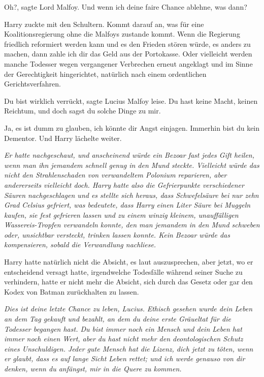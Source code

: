\glqq{}Oh?\grqq{}, sagte Lord Malfoy. \glqq{}Und wenn ich deine faire Chance
ablehne, was dann?\grqq{}

Harry zuckte mit den Schultern. \glqq{}Kommt darauf an, was für eine
Koalitionsregierung ohne die Malfoys zustande kommt. Wenn die Regierung
friedlich reformiert werden kann und es den Frieden stören würde, es anders zu
machen, dann zahle ich dir das Geld aus der Portokasse. Oder vielleicht werden
manche Todesser wegen vergangener Verbrechen erneut angeklagt und im Sinne der
Gerechtigkeit hingerichtet, natürlich nach einem ordentlichen
Gerichtsverfahren.\grqq{}

\glqq{}Du bist wirklich verrückt\grqq{}, sagte Lucius Malfoy leise. \glqq{}Du hast
keine Macht, keinen Reichtum, und doch sagst du solche Dinge zu mir.\grqq{}

\glqq{}Ja, es ist dumm zu glauben, ich könnte dir Angst einjagen. Immerhin bist
du kein Dementor.\grqq{} Und Harry lächelte weiter.

\emph{Er hatte nachgeschaut, und anscheinend würde ein Bezoar fast jedes Gift
heilen, wenn man ihn jemandem schnell genug in den Mund steckte. Vielleicht
würde das nicht den Strahlenschaden von verwandeltem Polonium reparieren, aber
andererseits vielleicht doch. Harry hatte also die Gefrierpunkte verschiedener
Säuren nachgeschlagen und es stellte sich heraus, dass Schwefelsäure bei nur
zehn Grad Celsius gefriert, was bedeutete, dass Harry einen Liter Säure bei
Muggeln kaufen, sie fest gefrieren lassen und zu einem winzig kleinem,
unauffälligen Wassereis-Tropfen verwandeln konnte, den man jemandem in den Mund
schweben oder, unsichtbar versteckt, trinken lassen konnte. Kein Bezoar würde
das kompensieren, sobald die Verwandlung nachliese.}

Harry hatte natürlich nicht die Absicht, es laut auszusprechen, aber jetzt, wo
er entscheidend versagt hatte, irgendwelche Todesfälle während seiner Suche zu
verhindern, hatte er nicht mehr die Absicht, sich durch das Gesetz oder gar den
Kodex von Batman zurückhalten zu lassen.

\emph{Dies ist deine letzte Chance zu leben, Lucius.}
\emph{Ethisch gesehen wurde dein Leben an dem Tag gekauft und bezahlt, an dem du
deine erste Gräueltat für die Todesser begangen hast. Du bist immer noch ein
Mensch und dein Leben hat immer noch einen Wert, aber du hast nicht mehr den
deontologischen Schutz eines Unschuldigen. Jeder gute Mensch hat die Lizenz,
dich jetzt zu töten, wenn er glaubt, dass es auf lange Sicht Leben rettet; und
ich werde genauso von dir denken, wenn du anfängst, mir in die Quere zu kommen.}

